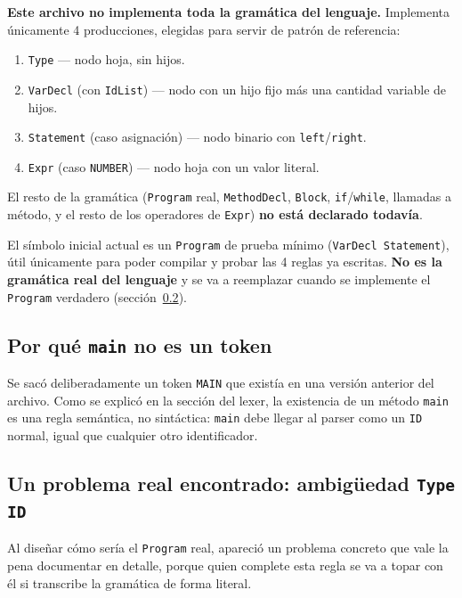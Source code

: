 \documentclass[11pt,a4paper]{article}
\begin{document}
\textbf{Este archivo no implementa toda la gram\'atica del lenguaje.}
Implementa \'unicamente 4 producciones, elegidas para servir de patr\'on
de referencia:

\begin{enumerate}
    \item \texttt{Type} --- nodo hoja, sin hijos.
    \item \texttt{VarDecl} (con \texttt{IdList}) --- nodo con un hijo
        fijo m\'as una cantidad variable de hijos.
    \item \texttt{Statement} (caso asignaci\'on) --- nodo binario con
        \texttt{left}/\texttt{right}.
    \item \texttt{Expr} (caso \texttt{NUMBER}) --- nodo hoja con un
        valor literal.
\end{enumerate}

El resto de la gram\'atica (\texttt{Program} real, \texttt{MethodDecl},
\texttt{Block}, \texttt{if}/\texttt{while}, llamadas a m\'etodo, y el
resto de los operadores de \texttt{Expr}) \textbf{no est\'a declarado
todav\'ia}. 

El s\'imbolo inicial actual es un \texttt{Program} de prueba m\'inimo
(\texttt{VarDecl Statement}), \'util \'unicamente para poder compilar y
probar las 4 reglas ya escritas. \textbf{No es la gram\'atica real del
lenguaje} y se va a reemplazar cuando se implemente el \texttt{Program}
verdadero (secci\'on~\ref{sec:program-real}).

\subsection{Por qu\'e \texttt{main} no es un token}

Se sac\'o deliberadamente un token \texttt{MAIN} que exist\'ia en una
versi\'on anterior del archivo. Como se explic\'o en la secci\'on del
lexer, la existencia de un m\'etodo \texttt{main} es una regla
sem\'antica, no sint\'actica: \texttt{main} debe llegar al parser como un
\texttt{ID} normal, igual que cualquier otro identificador.

\subsection{Un problema real encontrado: ambig\"uedad \texttt{Type ID}}
\label{sec:program-real}

Al dise\~nar c\'omo ser\'ia el \texttt{Program} real, apareci\'o un problema
concreto que vale la pena documentar en detalle, porque quien complete
esta regla se va a topar con \'el si transcribe la gram\'atica de forma
literal.
\end{document}
